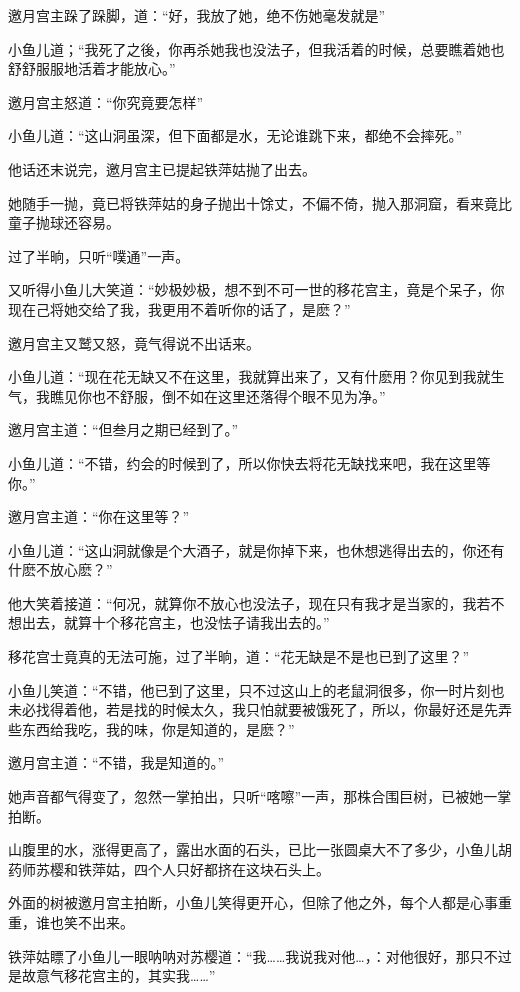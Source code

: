 \documentclass[12pt,oneside]{book}
\begin{document}
邀月宫主跺了跺脚，道：``好，我放了她，绝不伤她毫发就是''

小鱼儿道；``我死了之後，你再杀她我也没法子，但我活着的时候，总要瞧着她也舒舒服服地活着才能放心。''

邀月宫主怒道：``你究竟要怎样''

小鱼儿道：``这山洞虽深，但下面都是水，无论谁跳下来，都绝不会摔死。''

他话还末说完，邀月宫主已提起铁萍姑抛了出去。

她随手一抛，竟已将铁萍姑的身子抛出十馀丈，不偏不倚，抛入那洞窟，看来竟比童子抛球还容易。

过了半晌，只听``噗通''一声。

又听得小鱼儿大笑道：``妙极妙极，想不到不可一世的移花宫主，竟是个呆子，你现在己将她交给了我，我更用不着听你的话了，是麽？''

邀月宫主又鹫又怒，竟气得说不出话来。

小鱼儿道：``现在花无缺又不在这里，我就算出来了，又有什麽用？你见到我就生气，我瞧见你也不舒服，倒不如在这里还落得个眼不见为净。''

邀月宫主道：``但叁月之期已经到了。''

小鱼儿道：``不错，约会的时候到了，所以你快去将花无缺找来吧，我在这里等你。''

邀月宫主道：``你在这里等？''

小鱼儿道：``这山洞就像是个大酒子，就是你掉下来，也休想逃得出去的，你还有什麽不放心麽？''

他大笑着接道：``何况，就算你不放心也没法子，现在只有我才是当家的，我若不想出去，就算十个移花宫主，也没怯子请我出去的。''

移花宫士竟真的无法可施，过了半晌，道：``花无缺是不是也已到了这里？''

小鱼儿笑道：``不错，他已到了这里，只不过这山上的老鼠洞很多，你一时片刻也未必找得着他，若是找的时候太久，我只怕就要被饿死了，所以，你最好还是先弄些东西给我吃，我的味，你是知道的，是麽？''

邀月宫主道：``不错，我是知道的。''

她声音都气得变了，忽然一掌拍出，只听``喀嚓''一声，那株合围巨树，已被她一掌拍断。

山腹里的水，涨得更高了，露出水面的石头，已比一张圆桌大不了多少，小鱼儿胡药师苏樱和铁萍姑，四个人只好都挤在这块石头上。

外面的树被邀月宫主拍断，小鱼儿笑得更开心，但除了他之外，每个人都是心事重重，谁也笑不出来。

铁萍姑瞟了小鱼儿一眼呐呐对苏樱道：``我\ldots\ldots 我说我对他\ldots，：对他很好，那只不过是故意气移花宫主的，其实我\ldots\ldots{}''
\end{document}
